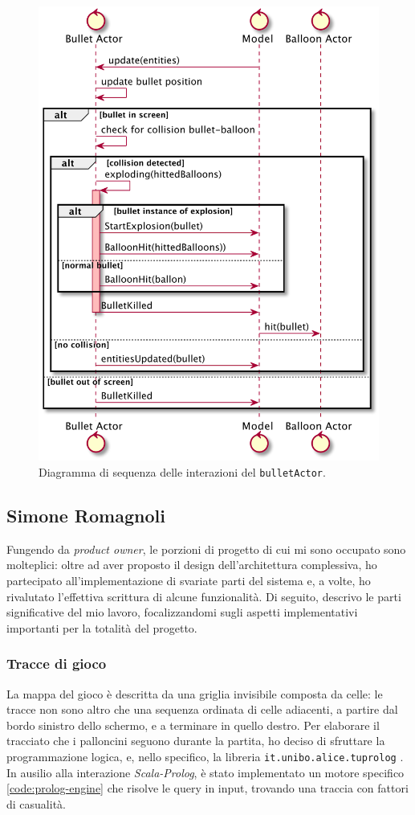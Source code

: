 \begin{figure}[H]
    \centering
    \includegraphics[width=.7\linewidth]{img/sequence-bullet-actor}
    \caption{Diagramma di sequenza delle interazioni del \texttt{bulletActor}.}
    \label{fig:sequence-bullet-actor}
\end{figure}

\subsection{Simone Romagnoli}
Fungendo da \textit{product owner}, le porzioni di progetto di cui mi sono occupato sono molteplici: oltre ad aver 
proposto il design dell'architettura complessiva, ho partecipato all'implementazione di svariate parti del sistema e, a 
volte, ho rivalutato l'effettiva scrittura di alcune funzionalità. Di seguito, descrivo le parti significative del mio 
lavoro, focalizzandomi sugli aspetti implementativi importanti per la totalità del progetto.

\subsubsection{Tracce di gioco}
La mappa del gioco è descritta da una griglia invisibile composta da celle: le tracce non sono altro
che una sequenza ordinata di celle adiacenti, a partire dal bordo sinistro dello schermo, e a terminare in quello
destro. Per elaborare il tracciato che i palloncini seguono durante la partita, ho deciso di sfruttare la programmazione
logica, e, nello specifico, la libreria \texttt{it.unibo.alice.tuprolog} \cite{tp}. In ausilio alla interazione
\textit{Scala-Prolog}, è stato implementato un motore specifico \ref{code:prolog-engine} che risolve le query in input,
trovando una traccia con fattori di casualità.


